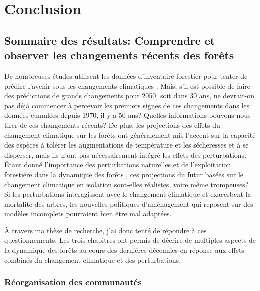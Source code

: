 \francais

\chapter*{Conclusion}

\hypertarget{sommaire-des-ruxe9sultats-comprendre-et-observer-les-changements-ruxe9cents-des-foruxeats}{%
\section{Sommaire des résultats: Comprendre et observer les changements
récents des
forêts}\label{sommaire-des-ruxe9sultats-comprendre-et-observer-les-changements-ruxe9cents-des-foruxeats}}

De nombreuses études utilisent les données d'inventaire forestier pour
tenter de prédire l'avenir sous les changements climatiques
\citep{boulanger_climate_2017, perie_dominant_2016, vissault_biogeographie_2016, meier_climate_2012, iverson_estimating_2008, chen_modeling_2002}.
Mais, s'il est possible de faire des prédictions de grands changements
pour 2050, soit dans 30 ans, ne devrait-on pas déjà commencer à
percevoir les premiers signes de ces changements dans les données
cumulées depuis 1970, il y a 50 ans? Quelles informations pouvons-nous
tirer de ces changements récents? De plus, les projections des effets du
changement climatique sur les forêts ont généralement mis l'accent sur
la capacité des espèces à tolérer les augmentations de température et
les sécheresses et à se disperser, mais ils n'ont pas nécessairement
intégré les effets des perturbations. Étant donné l'importance des
perturbations naturelles et de l'exploitation forestière dans la
dynamique des forêts \citep{turner_disturbance_2010}, ces projections du
futur basées sur le changement climatique en isolation sont-elles
réalistes, voire même trompeuses? Si les perturbations interagissent
avec le changement climatique et exacerbent la mortalité des arbres, les
nouvelles politiques d'aménagement qui reposent sur des modèles
incomplets pourraient bien être mal adaptées.

À travers ma thèse de recherche, j'ai donc tenté de répondre à ces
questionnements. Les trois chapitres ont permis de décrire de multiples
aspects de la dynamique des forêts au cours des dernières décennies en
réponse aux effets combinés du changement climatique et des
perturbations.

\hypertarget{ruxe9organisation-des-communautuxe9s}{%
\subsection{Réorganisation des
communautés}\label{ruxe9organisation-des-communautuxe9s}}

